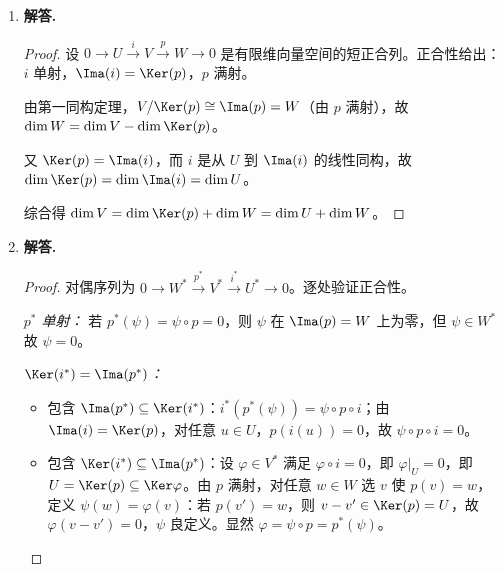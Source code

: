 \begin{enumerate}[label=\textbf{\arabic*.}, leftmargin=*, itemsep=1em]
\begin{proof}
\emph{正合性验证：}
\begin{itemize}
  \item 在 $U$ 处：$i$ 是包含映射，显然单射；
  \item 在 $V$ 处：$\Ima(i)=U$，且 $\Ker(\pi)=\{v\in V:v+U=U\}=U$，故 $\Ima(i)=\Ker(\pi)$；
  \item 在 $V/U$ 处：$\pi$ 是商映射，定义即满射。
\end{itemize}
故序列正合。

\emph{维数公式：} $\Ker(\pi)=U$，由第一同构定理（习题33），$V/\Ker(\pi)\cong\Ima(\pi)=V/U$，从而
\[
  \dim(V/U)=\dim V-\dim\Ker(\pi)=\dim V-\dim U,
\]
即 $\dim V=\dim U+\dim(V/U)$。
\end{proof}

\item \textbf{解答.}
\begin{proof}
设 $0\to U\xrightarrow{i}V\xrightarrow{p}W\to 0$ 是有限维向量空间的短正合列。正合性给出：$i$ 单射，$\Ima(i)=\Ker(p)$，$p$ 满射。

由第一同构定理，$V/\Ker(p)\cong\Ima(p)=W$（由 $p$ 满射），故 $\dim W=\dim V-\dim\Ker(p)$。

又 $\Ker(p)=\Ima(i)$，而 $i$ 是从 $U$ 到 $\Ima(i)$ 的线性同构，故 $\dim\Ker(p)=\dim\Ima(i)=\dim U$。

综合得 $\dim V=\dim\Ker(p)+\dim W=\dim U+\dim W$。
\end{proof}

\item \textbf{解答.}
\begin{proof}
对偶序列为 $0\to W^*\xrightarrow{p^*}V^*\xrightarrow{i^*}U^*\to 0$。逐处验证正合性。

\emph{$p^*$ 单射：} 若 $p^*(\psi)=\psi\circ p=0$，则 $\psi$ 在 $\Ima(p)=W$ 上为零，但 $\psi\in W^*$ 故 $\psi=0$。

\emph{$\Ker(i^*)=\Ima(p^*)$：}
\begin{itemize}
  \item 包含 $\Ima(p^*)\subseteq\Ker(i^*)$：$i^*(p^*(\psi))=\psi\circ p\circ i$；由 $\Ima(i)=\Ker(p)$，对任意 $u\in U$，$p(i(u))=0$，故 $\psi\circ p\circ i=0$。
  \item 包含 $\Ker(i^*)\subseteq\Ima(p^*)$：设 $\varphi\in V^*$ 满足 $\varphi\circ i=0$，即 $\varphi|_U=0$，即 $U=\Ker(p)\subseteq\Ker\varphi$。由 $p$ 满射，对任意 $w\in W$ 选 $v$ 使 $p(v)=w$，定义 $\psi(w)=\varphi(v)$：若 $p(v')=w$，则 $v-v'\in\Ker(p)=U$，故 $\varphi(v-v')=0$，$\psi$ 良定义。显然 $\varphi=\psi\circ p=p^*(\psi)$。
\end{itemize}


\end{proof}
\end{enumerate}

